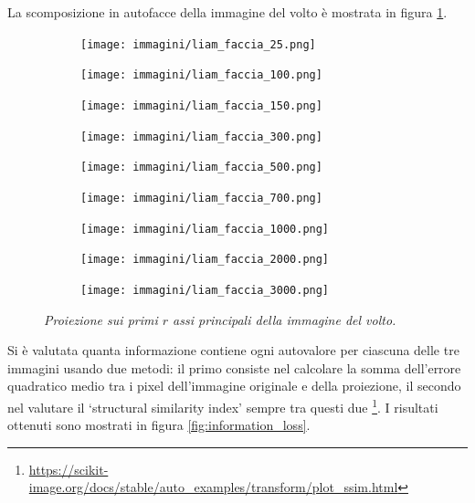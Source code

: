 \documentclass{article}
\begin{document}
La scomposizione in autofacce della immagine del volto è mostrata in figura \ref{fig:immagine_proiettata}.
\begin{figure}[H]
    \centering
    \begin{subfigure}[b]{0.29\textwidth}
        \centering
        \texttt{[image: immagini/liam\_faccia\_25.png]}
    \end{subfigure}
    \begin{subfigure}[b]{0.29\textwidth}
        \centering
        \texttt{[image: immagini/liam\_faccia\_100.png]}
    \end{subfigure}
    \begin{subfigure}[b]{0.29\textwidth}
        \centering
        \texttt{[image: immagini/liam\_faccia\_150.png]}
    \end{subfigure}
    \begin{subfigure}[b]{0.29\textwidth}
        \centering
        \texttt{[image: immagini/liam\_faccia\_300.png]}
    \end{subfigure}
    \begin{subfigure}[b]{0.29\textwidth}
        \centering
        \texttt{[image: immagini/liam\_faccia\_500.png]}
    \end{subfigure}
    \begin{subfigure}[b]{0.29\textwidth}
        \centering
        \texttt{[image: immagini/liam\_faccia\_700.png]}
    \end{subfigure}
    \begin{subfigure}[b]{0.29\textwidth}
        \centering
        \texttt{[image: immagini/liam\_faccia\_1000.png]}
    \end{subfigure}
    \begin{subfigure}[b]{0.29\textwidth}
        \centering
        \texttt{[image: immagini/liam\_faccia\_2000.png]}
    \end{subfigure}
    \begin{subfigure}[b]{0.29\textwidth}
        \centering
        \texttt{[image: immagini/liam\_faccia\_3000.png]}
    \end{subfigure}
    \caption{\emph{Proiezione sui primi $r$ assi principali della immagine del volto.}}
    \label{fig:immagine_proiettata}
\end{figure}

Si è valutata quanta informazione contiene ogni autovalore per ciascuna delle tre immagini usando due metodi:
il primo consiste nel calcolare la somma dell'errore quadratico medio tra i pixel dell'immagine originale e della proiezione,
il secondo nel valutare il `structural similarity index' sempre tra questi due \footnote{\url{https://scikit-image.org/docs/stable/auto_examples/transform/plot_ssim.html}}.
I risultati ottenuti sono mostrati in figura \ref{fig:information_loss}.
\end{document}
